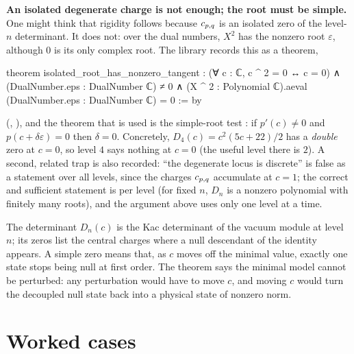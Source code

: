 \begin{warning}\label{l07:warn:doubleroot}
\textbf{An isolated degenerate charge is not enough; the root must be simple.} One might think that
rigidity follows because $c_{p,q}$ is an isolated zero of the level-$n$ determinant. It does not: over the
dual numbers, $X^2$ has the nonzero root $\varepsilon$, although $0$ is its only complex root. The library records
this as a theorem,
\begin{leancode}
theorem isolated_root_has_nonzero_tangent :
    (∀ c : ℂ, c ^ 2 = 0 ↔ c = 0) ∧
      (DualNumber.eps : DualNumber ℂ) ≠ 0 ∧
      (X ^ 2 : Polynomial ℂ).aeval (DualNumber.eps : DualNumber ℂ) = 0 := by
\end{leancode}
(, ),
and the theorem that is used is the simple-root test
: if $p'(c)\ne0$ and $p(c+\delta\varepsilon) = 0$ then $\delta = 0$. Concretely,
$D_4(c) = c^2(5c+22)/2$ has a \emph{double} zero at $c = 0$, so level $4$ says nothing at $c = 0$ (the useful
level there is $2$). A second, related trap is also recorded: ``the degenerate locus is discrete'' is false as
a statement over all levels, since the charges $c_{p,q}$ accumulate at $c = 1$; the correct and sufficient
statement is per level (for fixed $n$, $D_n$ is a nonzero polynomial with finitely many roots), and the
argument above uses only one level at a time.
\end{warning}
\begin{physics}
The determinant $D_n(c)$ is the Kac determinant of the vacuum module at level $n$; its zeros list the central
charges where a null descendant of the identity appears. A simple zero means that, as $c$ moves off the
minimal value, exactly one state stops being null at first order. The theorem says the minimal model cannot
be perturbed: any perturbation would have to move $c$, and moving $c$ would turn the decoupled null state back
into a physical state of nonzero norm.
\end{physics}


\section{Worked cases}\label{l07:sec:worked}

